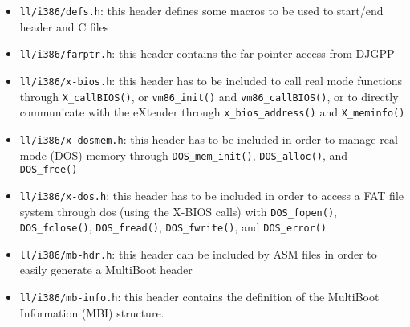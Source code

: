 \documentclass[a4paper]{report}
\begin{document}
\begin{itemize}
	\item {\tt ll/i386/defs.h}: this header defines some macros to be
		used to start/end header and C files
	\item {\tt ll/i386/farptr.h}: this header contains the far pointer
		access from DJGPP
	\item {\tt ll/i386/x-bios.h}: this header has to be included to
		call real mode functions through {\tt X\_callBIOS()}, or
		{\tt vm86\_init()} and {\tt vm86\_callBIOS()}, or to
		directly communicate with the eXtender through
		{\tt x\_bios\_address()} and {\tt X\_meminfo()}
	\item {\tt ll/i386/x-dosmem.h}: this header has to be included in
		order to manage real-mode (DOS) memory through
		{\tt DOS\_mem\_init()}, {\tt DOS\_alloc()}, and
		{\tt DOS\_free()}
	\item {\tt ll/i386/x-dos.h}: this header has to be included in
		order to access a FAT file system through dos (using the
		X-BIOS calls) with {\tt DOS\_fopen()},
		{\tt DOS\_fclose()}, {\tt DOS\_fread()},
		{\tt DOS\_fwrite()}, and {\tt DOS\_error()}
	\item {\tt ll/i386/mb-hdr.h}: this header can be included by ASM
		files in order to easily generate a MultiBoot header
	\item {\tt ll/i386/mb-info.h}: this header contains the definition
		of the MultiBoot Information (MBI) structure.
\end{itemize}

\end{document}
